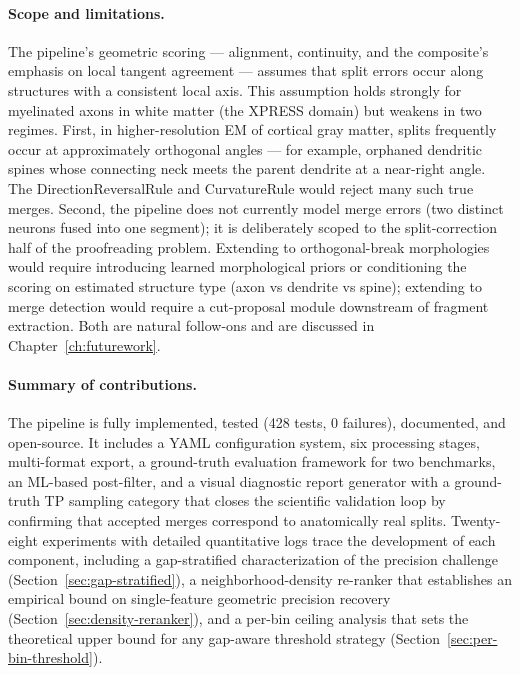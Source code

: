\paragraph{Scope and limitations.}
The pipeline's geometric scoring --- alignment, continuity, and the
composite's emphasis on local tangent agreement --- assumes that split
errors occur along structures with a consistent local axis. This assumption
holds strongly for myelinated axons in white matter (the XPRESS domain) but
weakens in two regimes. First, in higher-resolution EM of cortical gray
matter, splits frequently occur at approximately orthogonal angles --- for
example, orphaned dendritic spines whose connecting neck meets the parent
dendrite at a near-right angle. The DirectionReversalRule and CurvatureRule
would reject many such true merges. Second, the pipeline does not currently
model merge errors (two distinct neurons fused into one segment); it is
deliberately scoped to the split-correction half of the proofreading
problem. Extending to orthogonal-break morphologies would require
introducing learned morphological priors or conditioning the scoring on
estimated structure type (axon vs dendrite vs spine); extending to merge
detection would require a cut-proposal module downstream of fragment
extraction. Both are natural follow-ons and are discussed in
Chapter~\ref{ch:futurework}.

\paragraph{Summary of contributions.}
The pipeline is fully implemented, tested (428 tests, 0 failures), documented,
and open-source. It includes a YAML configuration system, six processing stages,
multi-format export, a ground-truth evaluation framework for two benchmarks,
an ML-based post-filter, and a visual diagnostic report generator with a
ground-truth TP sampling category that closes the scientific validation loop by
confirming that accepted merges correspond to anatomically real splits.
Twenty-eight experiments with detailed quantitative logs trace the development
of each component, including a gap-stratified characterization of the precision
challenge (Section~\ref{sec:gap-stratified}), a neighborhood-density re-ranker
that establishes an empirical bound on single-feature geometric precision
recovery (Section~\ref{sec:density-reranker}), and a per-bin ceiling analysis
that sets the theoretical upper bound for any gap-aware threshold strategy
(Section~\ref{sec:per-bin-threshold}).

